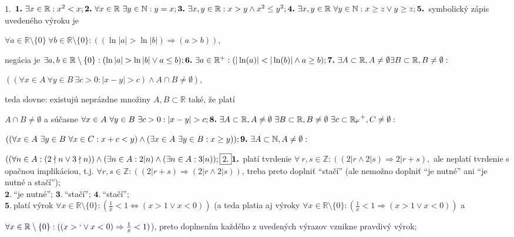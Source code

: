 $\boxed{1.}$
$\boldsymbol{1.}\ \exists x\in \mathbb{R}:x^2<x;\\
\boldsymbol{2.}\ \forall x\in \mathbb{R}\ \exists y\in \mathbb{N}:y=x;\\
\boldsymbol{3.}\ \exists x,y\in \mathbb{R}:x>y \wedge	x^2 \leq y^2;\\
\boldsymbol{4.}\ \exists x,y\in \mathbb{R}\ \forall y\in \mathbb{N}: x\geq z \vee y\geq z; \\
\boldsymbol{5.}\ $symbolický zápis uvedeného výroku je 

$\forall a\in \mathbb{R}\setminus \{0\}\ \forall b\in \mathbb{R}\setminus \{0\}:((\ln |a|>\ln |b|) \Rightarrow (a>b)),$ 

negácia je $\exists a,b\in \mathbb{R}\setminus \{0\}: (\ln|a|>\ln|b|\vee a\leq b);\\
\boldsymbol{6.}\ \exists a\in \mathbb{R^+}:(|\ln(a)|<|\ln(b)|\wedge a\geq b);\\
\boldsymbol{7.}\ \exists A\subset \mathbb{R},A\neq \emptyset \exists B\subset \mathbb{R},B\neq \emptyset:$

$((\forall x\in A\ \forall y\in B\ \exists c>0:|x-y|>c)\wedge A\cap B\neq \emptyset),$ 

teda slovne: existujú neprázdne množiny $A,B\subset \mathbb{R}$ také, že platí 

$A\cap B\neq \emptyset$ a súčasne $\forall x\in A\ \forall y\in B\ \exists c>0:|x-y|>c;\\
\boldsymbol{8.}\ \exists A\subset \mathbb{R},A\neq \emptyset\ \exists B\subset \mathbb{R},B\neq \emptyset\ \exists c\subset \mathbb{{R_{0}}^+},C\neq \emptyset:$

$((\forall x\in A\ \exists y\in B\ \forall x\in C:x+c<y)\wedge(\exists x\in A\ \exists y\in B: x\geq y));\\
\boldsymbol{9.}\ \exists A\subset \mathbb{N},A\neq \emptyset:$

$((\forall n\in A:(2\nmid n\vee 3\nmid n))\wedge (\exists n\in A: 2|n)\wedge (\exists n\in A:3|n));\\
\boxed{2.}
\boldsymbol{1.}\ $platí tvrdenie $\forall\ r,s\in\mathbb{Z}:((2|r\wedge 2|s)\Rightarrow 2|r+s),$ ale neplatí tvrdenie s opačnou implikáciou, t.j. $\forall r,s\in\mathbb{Z}:((2|r+s)\Rightarrow (2|r \wedge 2|s))$, treba preto doplniť ``stačí'' (ale nemožno doplniť ``je nutné'' ani ``je nutné a stačí'');\\
$\boldsymbol{2.}\ $``je nutné'';
$\boldsymbol{3.}\ $``stačí'';
$\boldsymbol{4.}\ $``stačí'';\\
$\boldsymbol{5.}\ $platí výrok $\forall x\in\mathbb{R}\setminus \{0\}:(\frac{1}{x}<1\iff (x>1 \vee x<0))$ (a teda platia aj výroky $\forall x\in\mathbb{R}\setminus \{0\}:(\frac{1}{x}<1\Rightarrow (x>1 \vee x<0))$ a 

$\forall x\in \mathbb{R}\setminus \{0\}:((x>` \vee x<0)\Rightarrow \frac{1}{x}<1)$), preto doplnením každého z uvedených výrazov vznikne pravdivý výrok;
